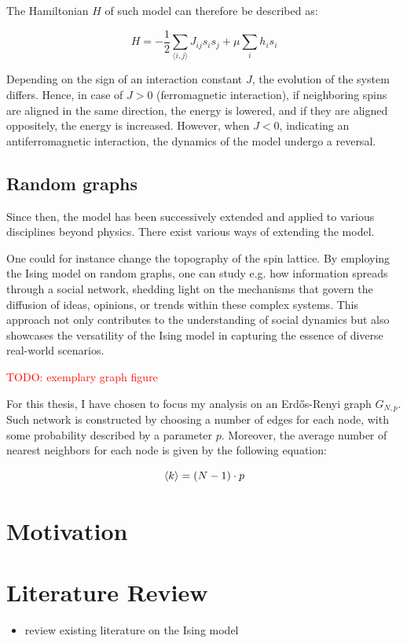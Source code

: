 \documentclass[11pt,a4paper]{article}
\newcommand{\todo}[1]{\textcolor{red}{TODO: #1}}
\begin{document}
The Hamiltonian $H$ of such model can therefore be described as:

\begin{equation}
    H = -\frac12\sum_{\langle i,j \rangle} J_{ij} s_i s_j + \mu\sum_i h_i s_i
\end{equation}

Depending on the sign of an interaction constant $J$, the evolution of the system differs. Hence, in case of $J>0$ (ferromagnetic interaction), if neighboring spins are aligned in the same direction, the energy is lowered, and if they are aligned oppositely, the energy is increased. However, when $J<0$, indicating  an antiferromagnetic interaction, the dynamics of the model undergo a reversal.


\subsection{Random graphs}

Since then, the model has been successively extended and applied to various disciplines beyond physics. There exist various ways of extending the model.

One could for instance change the topography of the spin lattice. By employing the Ising model on random graphs, one can study e.g. how information spreads through a social network, shedding light on the mechanisms that govern the diffusion of ideas, opinions, or trends within these complex systems. This approach not only contributes to the understanding of social dynamics but also showcases the versatility of the Ising model in capturing the essence of diverse real-world scenarios.

\todo{exemplary graph figure}

For this thesis, I have chosen to focus my analysis on an Erdős-Renyi graph $G_{N,p}$. Such network is constructed by choosing a number of edges for each node, with some probability described by a parameter $p$. Moreover, the average number of nearest neighbors for each node is given by the following equation:

\begin{equation}
    \braket{k} = (N-1) \cdot p
\end{equation}

\section{Motivation}

\section{Literature Review}
\begin{itemize}
\item review existing literature on the Ising model
\end{itemize}
\end{document}

